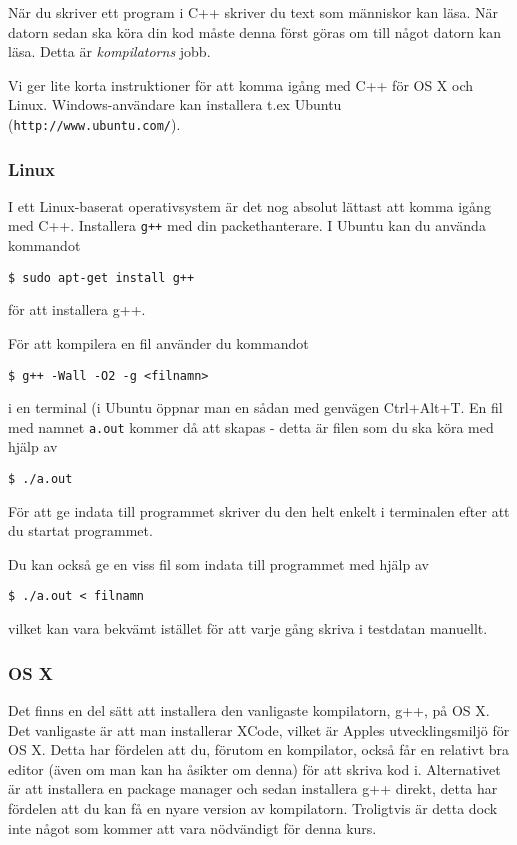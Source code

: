 När du skriver ett program i C++ skriver du text som människor kan läsa. När datorn sedan ska köra din kod måste denna först göras om till något datorn kan läsa. Detta är \emph{kompilatorns} jobb.

Vi ger lite korta instruktioner för att komma igång med C++ för OS X och Linux. Windows-användare kan installera t.ex Ubuntu (\texttt{http://www.ubuntu.com/}).

\subsubsection{Linux}
I ett Linux-baserat operativsystem är det nog absolut lättast att komma igång med C++. Installera \texttt{g++} med din packethanterare. I Ubuntu kan du använda kommandot

\texttt{\$ sudo apt-get install g++}

för att installera g++.

För att kompilera en fil använder du kommandot

\texttt{\$ g++ -Wall -O2 -g <filnamn>}

i en terminal (i Ubuntu öppnar man en sådan med genvägen Ctrl+Alt+T. En fil med namnet \texttt{a.out} kommer då att skapas - detta är filen som du ska köra med hjälp av

\texttt{\$ ./a.out}

För att ge indata till programmet skriver du den helt enkelt i terminalen efter att du startat programmet.

Du kan också ge en viss fil som indata till programmet med hjälp av

\texttt{\$ ./a.out < filnamn}

vilket kan vara bekvämt istället för att varje gång skriva i testdatan manuellt.

\subsubsection{OS X}

Det finns en del sätt att installera den vanligaste kompilatorn, g++, på OS X. Det vanligaste är att man installerar XCode, vilket är Apples utvecklingsmiljö för OS X. Detta har fördelen att du, förutom en kompilator, också får en relativt bra editor (även om man kan ha åsikter om denna) för att skriva kod i. Alternativet är att installera en package manager och sedan installera g++ direkt, detta har fördelen att du kan få en nyare version av kompilatorn. Troligtvis är detta dock inte något som kommer att vara nödvändigt för denna kurs.

